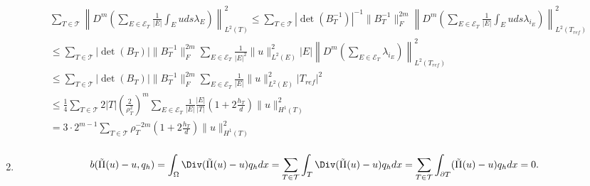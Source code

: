 \begin{solution}
\begin{enumerate}[label = \textbf{\alph*)}]
  \begin{align*}
  &\sum_{T \in \mathcal{T}} \left\| D^m\left(\sum_{E \in \mathcal{E}_T}\frac{1}{|E|}\int_E u ds
   \lambda_E\right)\right\|_{L^2(T)}^2 \leq
   \sum_{T \in \mathcal{T}}|\det(B_T^{-1})|^{-1}\|B_T^{-1}\|_F^{2m}
   \left\|D^m\left(\sum_{E \in \mathcal{E}_T}\frac{1}{|E|}\int_E u ds
    \lambda_{i_E}\right)\right\|_{L^2(T_{ref})}^2 \\
    &\leq \sum_{T \in \mathcal{T}}|\det(B_T)|\|B_T^{-1}\|_F^{2m}
    \sum_{E \in \mathcal{E}_T}
    \frac{1}{|E|^2}\|u\|_{L^2(E)}^2|E|
    \left\|D^m\left(\sum_{E \in \mathcal{E}_T}
     \lambda_{i_E}\right)\right\|_{L^2(T_{ref})}^2 \\
     &\leq \sum_{T \in \mathcal{T}}|\det(B_T)|\|B_T^{-1}\|_F^{2m}
     \sum_{E \in \mathcal{E}_T}
     \frac{1}{|E|}\|u\|_{L^2(E)}^2|T_{ref}|^2 \\
     &\leq \frac{1}{4}\sum_{T \in \mathcal{T}}2|T|\left(\frac{2}{\rho_T^2}\right)^m
     \sum_{E \in \mathcal{E}_T}
     \frac{1}{|E|}\frac{|E|}{|T|}\left(1 + 2\frac{h_T}{d}\right)\|u\|_{H^1(T)}^2\\
     &= 3\cdot2^{m - 1}\sum_{T \in \mathcal{T}}\rho_T^{-2m}
     \left(1 + 2\frac{h_T}{d}\right)\|u\|_{H^1(T)}^2\\
  \end{align*}

  \item

  \begin{align*}
    b(\tilde{\Pi}(u) - u, q_h) = \int_\Omega \Div(\tilde{\Pi}(u) - u)q_h dx
    = \sum_{T \in \mathcal{T}}\int_T \Div(\tilde{\Pi}(u) - u)q_h dx
    = \sum_{T \in \mathcal{T}}\int_{\partial T} (\tilde{\Pi}(u) - u)q_h dx = 0.
  \end{align*}
\end{enumerate}


\end{solution}


